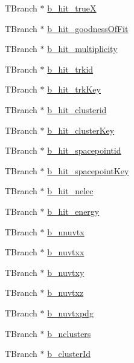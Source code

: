 \begin{DoxyCompactItemize}
\item 
T\-Branch $\ast$ \hyperlink{classanatree_ae6895af553f60ca6df1e0b8a188a729c}{b\-\_\-hit\-\_\-true\-X}
\item 
T\-Branch $\ast$ \hyperlink{classanatree_a339f11d08fdce9583db8b8c5b8ec8752}{b\-\_\-hit\-\_\-goodness\-Of\-Fit}
\item 
T\-Branch $\ast$ \hyperlink{classanatree_a4c01a0a80c5868387a517fc0330980d1}{b\-\_\-hit\-\_\-multiplicity}
\item 
T\-Branch $\ast$ \hyperlink{classanatree_a8693443815becaeb7aa509f6fcca6b84}{b\-\_\-hit\-\_\-trkid}
\item 
T\-Branch $\ast$ \hyperlink{classanatree_abeccc186a488a6a3be9d89014880bed5}{b\-\_\-hit\-\_\-trk\-Key}
\item 
T\-Branch $\ast$ \hyperlink{classanatree_ab7e18b3b259e1b6dddc3b9e6f10cdcb6}{b\-\_\-hit\-\_\-clusterid}
\item 
T\-Branch $\ast$ \hyperlink{classanatree_aa83f1bd44f10c67dff08e254d255bac4}{b\-\_\-hit\-\_\-cluster\-Key}
\item 
T\-Branch $\ast$ \hyperlink{classanatree_a960d5b84d2f29c6d5fa6b28ed980ebc2}{b\-\_\-hit\-\_\-spacepointid}
\item 
T\-Branch $\ast$ \hyperlink{classanatree_a0684dae14dd98c6c10518c448048f845}{b\-\_\-hit\-\_\-spacepoint\-Key}
\item 
T\-Branch $\ast$ \hyperlink{classanatree_af7b96e2e3ba75f7e5d1d69b4dfb7048f}{b\-\_\-hit\-\_\-nelec}
\item 
T\-Branch $\ast$ \hyperlink{classanatree_ae8a1cf81ba11ba4c779800839f7dcf5c}{b\-\_\-hit\-\_\-energy}
\item 
T\-Branch $\ast$ \hyperlink{classanatree_a452b5ba4ae1b3aaf396bbe61ca11ec52}{b\-\_\-nnuvtx}
\item 
T\-Branch $\ast$ \hyperlink{classanatree_a126a9f6b5eb9a1ffab01f9799e6a296b}{b\-\_\-nuvtxx}
\item 
T\-Branch $\ast$ \hyperlink{classanatree_a2f1d435275d1d41445d733fa73b20df2}{b\-\_\-nuvtxy}
\item 
T\-Branch $\ast$ \hyperlink{classanatree_a1e8cb73d7589c82d63e16e04715756dd}{b\-\_\-nuvtxz}
\item 
T\-Branch $\ast$ \hyperlink{classanatree_af307a3e20680931598a7b6c3d90c9b0c}{b\-\_\-nuvtxpdg}
\item 
T\-Branch $\ast$ \hyperlink{classanatree_af1083b6389ce80b46873d5452c08ad66}{b\-\_\-nclusters}
\item 
T\-Branch $\ast$ \hyperlink{classanatree_ab8f7649098e53db2cae4786cd614215c}{b\-\_\-cluster\-Id}

\end{DoxyCompactItemize}
